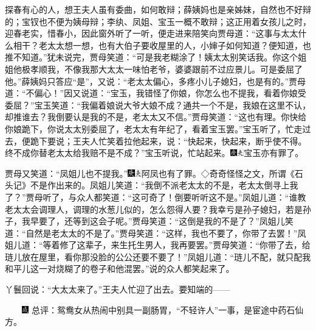 探春有心的人，想王夫人虽有委曲，如何敢辩；薛姨妈也是亲姊妹，自然也不好辩的；宝钗也不便为姨母辩；李纨、凤姐、宝玉一概不敢辩；这正用着女孩儿之时，迎春老实，惜春小，因此窗外听了一听，便走进来陪笑向贾母道：``这事与太太什么相干？老太太想一想，也有大伯子要收屋里的人，小婶子如何知道？便知道，也推不知道。''犹未说完，贾母笑道：``可是我老糊涂了！姨太太别笑话我。你这个姐姐他极孝顺我，不像我那大太太一味怕老爷，婆婆跟前不过应景儿。可是委屈了他。''薛姨妈只答应``是''，又说：``老太太偏心，多疼小儿子媳妇，也是有的。''贾母道：``不偏心！''因又说道：``宝玉，我错怪了你娘，你怎么也不提我，看着你娘受委屈？''宝玉笑道：``我偏着娘说大爷大娘不成？通共一个不是，我娘在这里不认，却推谁去？我倒要认是我的不是，老太太又不信。''贾母笑道：``这也有理。你快给你娘跪下，你说太太别委屈了，老太太有年纪了，看着宝玉罢。''宝玉听了，忙走过去，便跪下要说；王夫人忙笑着拉他起来，说：``快起来，快起来，断乎使不得。终不成你替老太太给我赔不是不成？''宝玉听说，忙站起来。{\includegraphics[width=3mm]{../Images/00004}\includegraphics[width=3mm]{../Images/00012}\footnotesize \kaishu 宝玉亦有罪了。}

贾母又笑道：``凤姐儿也不提我。''{\includegraphics[width=3mm]{../Images/00004}\includegraphics[width=3mm]{../Images/00012}\footnotesize \kaishu 阿凤也有了罪。◇奇奇怪怪之文，所谓《石头记》不是作出来的。}凤姐儿笑道：``我倒不派老太太的不是，老太太倒寻上我了？''贾母听了，与众人都笑道：``这可奇了！倒要听听这不是。''凤姐儿道：``谁教老太太会调理人，调理的水葱儿似的，怎么怨得人要？我幸亏是孙子媳妇，若是孙子，我早要了，还等到这会子呢。''贾母笑道：``这倒是我的不是了？''凤姐儿笑道：``自然是老太太的不是了。''贾母笑道：``这样，我也不要了，你带了去罢！''凤姐儿道：``等着修了这辈子，来生托生男人，我再要罢。''贾母笑道：``你带了去，给琏儿放在屋里，看你那没脸的公公还要不要了！''凤姐儿道：``琏儿不配，就只配我和平儿这一对烧糊了的卷子和他混罢。''说的众人都笑起来了。

丫鬟回说：``大太太来了。''王夫人忙迎了出去。要知端的------

{　　\includegraphics[width=3mm]{../Images/00005} \kaishu 总评：鸳鸯女从热闹中别具一副肠胃，``不轻许人''一事，是宦途中药石仙方。}

